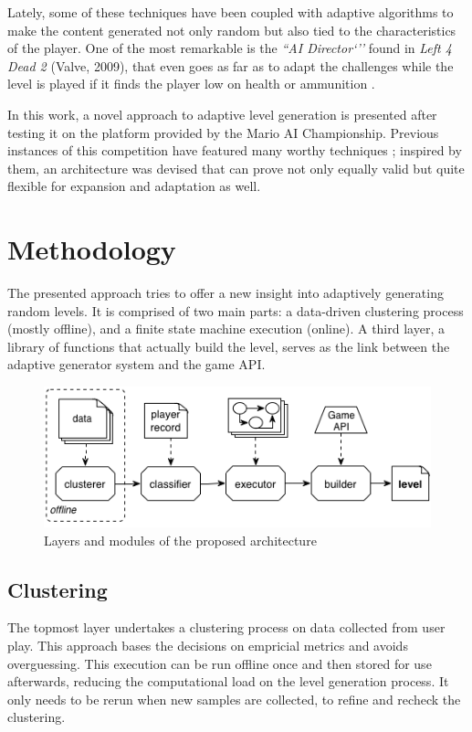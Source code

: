 \documentclass[conference]{IEEEtran}
\begin{document}
Lately, some of these techniques have been coupled with adaptive algorithms to make the content generated not only random but also tied to the characteristics of the player. One of the most remarkable is the \textit{``AI Director`''} found in \textit{Left 4 Dead 2} (Valve, 2009), that even goes as far as to adapt the challenges while the level is played if it finds the player low on health or ammunition \cite{l4d09}.

In this work, a novel approach to adaptive level generation is presented after testing it on the platform provided by the Mario AI Championship. Previous instances of this competition have featured many worthy techniques \cite{mario2010}; inspired by them, an architecture was devised that can prove not only equally valid but quite flexible for expansion and adaptation as well.

\section{Methodology}

The presented approach tries to offer a new insight into adaptively generating random levels. It is comprised of two main parts: a data-driven clustering process (mostly offline), and a finite state machine execution (online). A third layer, a library of functions that actually build the level, serves as the link between the adaptive generator system and the game API. 

\begin{figure}[htp]
\centerline{\includegraphics[width=1.2\columnwidth]{layers.png}}
\caption{Layers and modules of the proposed architecture}
\label{layers}
\end{figure}

\subsection{Clustering}

The topmost layer undertakes a clustering process on data collected from user play. This approach bases the decisions on empricial metrics and avoids overguessing. This execution can be run offline once and then stored for use afterwards, reducing the computational load on the level generation process. It only needs to be rerun when new samples are collected, to refine and recheck the clustering.
\end{document}
